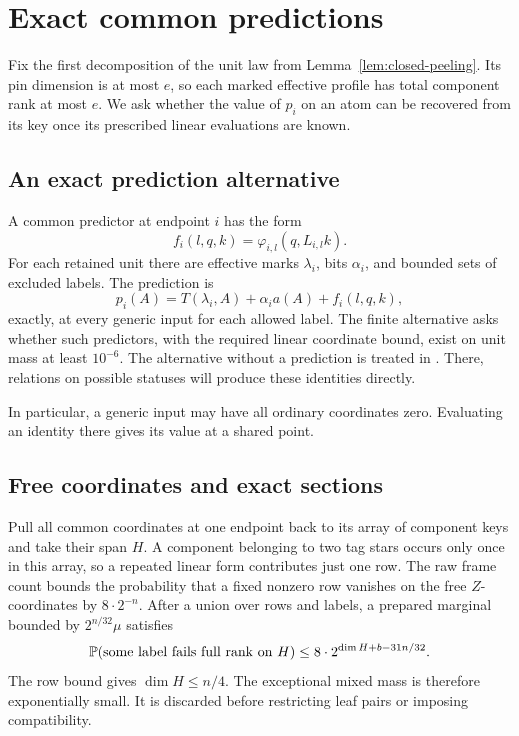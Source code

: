 \section{Exact common predictions}\label{sec:preparation}

Fix the first decomposition of the unit law from
Lemma~\ref{lem:closed-peeling}. Its pin dimension is at most \(e\),
so each marked effective profile has total component rank at most \(e\).
We ask whether the value of \(p_i\) on an atom can be recovered from
its key once its prescribed linear evaluations are known.

\subsection{An exact prediction alternative}

A common predictor at endpoint \(i\) has the form
\begin{equation}\label{eq:linear-predictor}
 f_i(l,q,k)=\varphi_{i,l}(q,L_{i,l}k).
\end{equation}
For each retained unit there are effective marks \(\lambda_i\), bits
\(\alpha_i\), and bounded sets of excluded labels. The prediction is
\begin{equation}\label{eq:common-prediction}
 p_i(A)=T(\lambda_i,A)+\alpha_i a(A)+f_i(l,q,k),
\end{equation}
exactly, at every generic input for each allowed label. The finite alternative
asks whether such predictors, with the required linear coordinate bound,
exist on unit mass at least \(10^{-6}\). The alternative without a
prediction is treated in . There, relations on
possible statuses will produce these identities directly.

In particular, a generic input may have all ordinary coordinates
zero. Evaluating an identity there gives its value at a shared point.

\subsection{Free coordinates and exact sections}

Pull all common coordinates at one endpoint back to its array of component
keys and take their span \(H\). A component belonging to two tag stars occurs only
once in this array, so a repeated linear form contributes just one row.
The raw frame count bounds the probability that a fixed nonzero row
vanishes on the free \(Z\)-coordinates by \(8\cdot2^{-n}\).
After a union over rows and labels, a prepared marginal bounded by
\(2^{n/32}\mu\) satisfies
\begin{equation}\label{eq:prepared-rank}
 \mathbb P(\text{some label fails full rank on }H)
 \le8\cdot2^{\dim H+b-31n/32}.
\end{equation}
The row bound gives \(\dim H\le n/4\). The exceptional mixed mass is
therefore exponentially small. It is discarded before restricting leaf
pairs or imposing compatibility.

